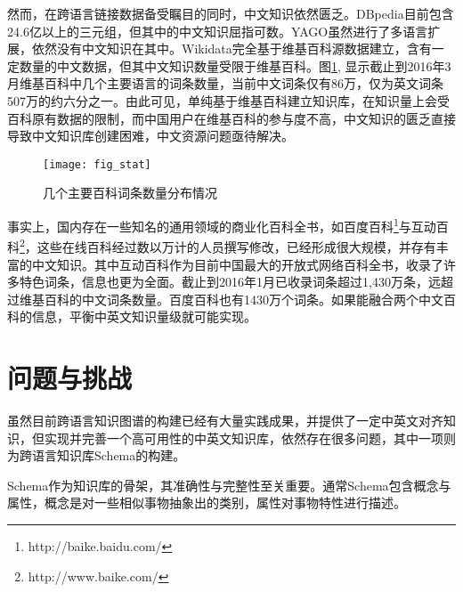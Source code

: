 然而，在跨语言链接数据备受瞩目的同时，中文知识依然匮乏。DBpedia目前包含24.6亿以上的三元组，但其中的中文知识屈指可数。YAGO虽然进行了多语言扩展，依然没有中文知识在其中。Wikidata完全基于维基百科源数据建立，含有一定数量的中文数据，但其中文知识数量受限于维基百科。图\ref{fig:wiki-stat}, 显示截止到2016年3月维基百科中几个主要语言的词条数量，当前中文词条仅有86万，仅为英文词条507万的约六分之一。由此可见，单纯基于维基百科建立知识库，在知识量上会受百科原有数据的限制，而中国用户在维基百科的参与度不高，中文知识的匮乏直接导致中文知识库创建困难，中文资源问题亟待解决。

\begin{figure}[H] %
  \centering
  \texttt{[image: fig\_stat]}
  \caption{几个主要百科词条数量分布情况}
  \label{fig:wiki-stat}
\end{figure}

事实上，国内存在一些知名的通用领域的商业化百科全书，如百度百科\footnote{http://baike.baidu.com/}与互动百科\footnote{http://www.baike.com/}，这些在线百科经过数以万计的人员撰写修改，已经形成很大规模，并存有丰富的中文知识。其中互动百科作为目前中国最大的开放式网络百科全书，收录了许多特色词条，信息也更为全面。截止到2016年1月已收录词条超过1,430万条，远超过维基百科的中文词条数量。百度百科也有1430万个词条。如果能融合两个中文百科的信息，平衡中英文知识量级就可能实现。


\section{问题与挑战}

虽然目前跨语言知识图谱的构建已经有大量实践成果，并提供了一定中英文对齐知识，但实现并完善一个高可用性的中英文知识库，依然存在很多问题，其中一项则为跨语言知识库Schema的构建。

Schema作为知识库的骨架，其准确性与完整性至关重要。通常Schema包含概念与属性，概念是对一些相似事物抽象出的类别，属性对事物特性进行描述。


